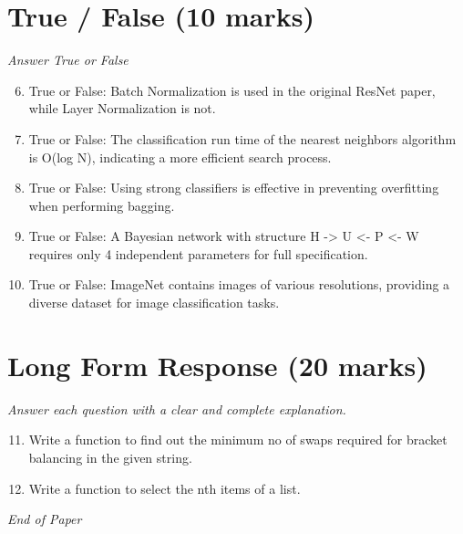 \documentclass[12pt]{article}
\begin{document}
\section*{True / False (10 marks)}
\textit{Answer True or False}
\begin{enumerate}[label=\arabic*.]
\setcounter{enumi}{5}
\item True or False: Batch Normalization is used in the original ResNet paper, while Layer Normalization is not.
\item True or False: The classification run time of the nearest neighbors algorithm is O(log N), indicating a more efficient search process.
\item True or False: Using strong classifiers is effective in preventing overfitting when performing bagging.
\item True or False: A Bayesian network with structure H -\textgreater{} U \textless{}- P \textless{}- W requires only 4 independent parameters for full specification.
\item True or False: ImageNet contains images of various resolutions, providing a diverse dataset for image classification tasks.
\end{enumerate}

\section*{Long Form Response (20 marks)}
\textit{Answer each question with a clear and complete explanation.}
\begin{enumerate}[label=\arabic*.]
\setcounter{enumi}{10}
\item Write a function to find out the minimum no of swaps required for bracket balancing in the given string.
\item Write a function to select the nth items of a list.
\end{enumerate}

\vfill
\noindent\textit{End of Paper}
\end{document}
